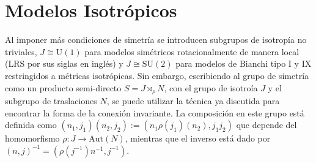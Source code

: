 \section{Modelos Isotr\'{o}picos}

Al imponer m\'{a}s condiciones de simetr\'{i}a se introducen subgrupos de isotrop\'{i}a no triviales, $J \cong \mathrm{U}(1)$ para modelos sim\'{e}tricos rotacionalmente de manera local (LRS por sus siglas en ingl\'{e}s) y $J \cong \mathrm{SU}(2)$ para modelos de Bianchi tipo I y IX restringidos a m\'{e}tricas isotr\'{o}picas. Sin embargo, escribiendo al grupo de simetr\'{i}a como un producto semi-directo $S = J \rtimes_{\rho} N$, con el grupo de isotro\'{i}a $J$ y el subgrupo de traslaciones $N$, se puede utilizar la t\'{e}cnica ya discutida para encontrar la forma de la conexi\'{o}n invariante. La composici\'{o}n en este grupo est\'{a} definida como $(n_{1}, j_{1})(n_{2}, j_{2}) := (n_{1} \rho(j_{1}) (n_{2}), j_{1} j_{2} )$ que depende del homomorfismo $\rho: J \longrightarrow \mathrm{Aut}(N)$, mientras que el inverso est\'{a} dado por $(n, j)^{-1} = (\rho(j^{-1}) n^{-1}, j^{-1})$.

